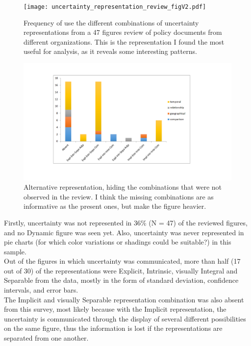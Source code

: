 \documentclass[12pt,a4paper]{article}
\begin{document}
\begin{figure}
\centering
\texttt{[image: uncertainty\_representation\_review\_figV2.pdf]}
\caption{Frequency of use the different combinations of uncertainty representations from a 47 figures review of policy documents from different organizations. This is the representation I found the most useful for analysis, as it reveals some interesting patterns.}
\includegraphics[scale=0.5]{workshop-figV2.png}
\caption{Alternative representation, hiding the combinations that were not observed in the review. I think the missing combinations are as informative as the present ones, but make the figure heavier.}
\label{res1}
\end{figure}
Firstly, uncertainty was not represented in 36\% (N = 47) of the reviewed figures, and
no Dynamic figure was seen yet.
Also, uncertainty was never represented in pie charts (for which color variations or shadings could be suitable?) in this sample.\\
Out of the figures in which uncertainty was communicated, more than half (17 out of 30) of the representations were Explicit, Intrinsic, visually Integral and Separable from the data, mostly in the form of standard deviation, confidence intervals, and error bars.\\
The Implicit and visually Separable representation combination was also absent from this survey, most likely because with the Implicit representation, the uncertainty is communicated through the display of several different possibilities on the same figure, thus the information is lost if the representations are separated from one another.\\
\end{document}
